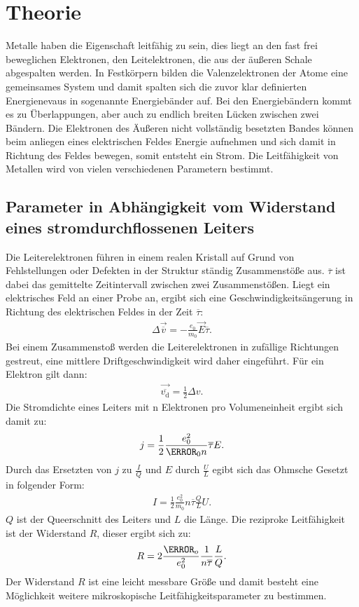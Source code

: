 \section{Theorie}
\label{sec:Theorie}
Metalle haben die Eigenschaft leitfähig zu sein, dies liegt an den
fast frei beweglichen Elektronen, den Leitelektronen, die aus der äußeren Schale abgespalten werden.
In Festkörpern bilden die Valenzelektronen der Atome eine gemeinsames System und damit spalten sich
die zuvor klar definierten Energienevaus in sogenannte Energiebänder auf.
Bei den Energiebändern kommt es zu Überlappungen, aber auch zu endlich breiten Lücken zwischen zwei Bändern.
Die Elektronen des Äußeren nicht vollständig besetzten Bandes können beim anliegen eines elektrischen Feldes Energie aufnehmen
und sich damit in Richtung des Feldes bewegen, somit entsteht ein Strom. Die Leitfähigkeit von Metallen wird von vielen verschiedenen Parametern bestimmt.

\subsection{Parameter in Abhängigkeit vom Widerstand eines stromdurchflossenen Leiters}
Die Leiterelektronen führen in einem realen Kristall auf Grund von Fehlstellungen oder Defekten in der Struktur ständig
Zusammenstöße aus. $\overline{\tau}$ ist dabei das gemittelte Zeitintervall zwischen zwei Zusammenstößen. Liegt ein elektrisches Feld an
einer Probe an, ergibt sich eine Geschwindigkeitsängerung in Richtung des elektrischen Feldes in der Zeit $\overline{\tau}$:
\begin{align}
\Delta\vec{\overline{v}}=-\frac{e_0}{m_0}\vec{E}\overline{\tau}.
\end{align}
Bei einem Zusammenstoß werden die Leiterelektronen in zufällige Richtungen gestreut, eine mittlere Driftgeschwindigkeit wird daher eingeführt.
Für ein Elektron gilt dann:
\begin{align}
\vec{\overline{v_\mathrm{d}}}=\frac{1}{2}\Delta v.
\end{align}
Die Stromdichte eines Leiters mit n Elektronen pro Volumeneinheit ergibt sich damit zu:
\begin{align}
j=\frac{1}{2}\frac{e_0^2}{\m_0 n} \overline{\tau} E.
\end{align}
Durch das Ersetzten von $j$ zu $\frac{I}{Q}$ und $E$ durch $\frac{U}{L}$ egibt sich das Ohmsche Gesetzt in folgender Form:
\begin{align}
I=\frac{1}{2}\frac{e_0^2}{m_0}n\overline{\tau} \frac{Q}{L}U.
\end{align}
$Q$ ist der Queerschnitt des Leiters und $L$ die Länge.
Die reziproke Leitfähigkeit ist der Widerstand $R$, dieser ergibt sich zu:
\begin{align}
R=2\frac{\m_o}{e_0^2}\frac{1}{n\overline{\tau}}\frac{L}{Q}\label{eqn:wiederstand}.
\end{align}
Der Widerstand $R$ ist eine leicht messbare Größe und damit besteht eine Möglichkeit weitere mikroskopische Leitfähigkeitsparameter
zu bestimmen.

